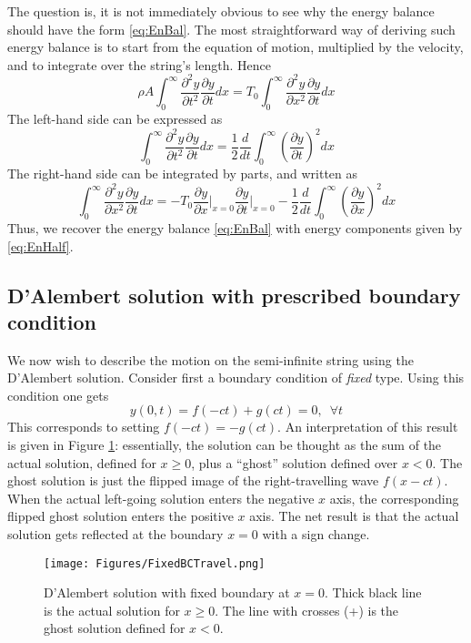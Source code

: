 \noindent
The question is, it is not immediately obvious to see why the energy balance should have the form \eqref{eq:EnBal}. The most straightforward way of deriving such energy balance is to start from the equation of motion, multiplied by the velocity, and to integrate over the string's length. Hence
\begin{equation}
\rho A \int_0^{\infty} \frac{\partial^2 y}{\partial t^2} \frac{\partial y}{\partial t} dx = T_0 \int_0^{\infty} \frac{\partial^2 y}{\partial x^2} \frac{\partial y}{\partial t} dx
\end{equation}
The left-hand side can be expressed as
\begin{equation}
\int_0^{\infty}\frac{\partial^2 y}{\partial t^2} \frac{\partial y}{\partial t} dx = \frac{1}{2}\frac{d}{dt}\int_0^{\infty} \left( \frac{\partial y}{\partial t}\right)^2 dx
\end{equation}
The right-hand side can be integrated by parts, and written as
\begin{equation}
\int_0^{\infty} \frac{\partial^2 y}{\partial x^2} \frac{\partial y}{\partial t} dx = - T_0 \frac{\partial y}{\partial x }\Bigg|_{x=0}\frac{\partial y}{\partial t }\Bigg|_{x=0} - \frac{1}{2}\frac{d}{dt}  \int_0^{\infty}\left( \frac{\partial y}{\partial x}\right)^2 dx
\end{equation}
Thus, we recover the energy balance \eqref{eq:EnBal} with energy components given by \eqref{eq:EnHalf}. 





\subsection{D'Alembert solution with prescribed boundary condition}


We now wish to describe the motion on the semi-infinite string using the D'Alembert solution. Consider first a boundary condition of \emph{fixed} type. Using this condition one gets
\begin{equation}
y(0,t) = f(-ct) + g(ct) = 0, \,\,\, \forall t
\end{equation}
This corresponds to setting $f(-ct) = -g(ct)$. An interpretation of this result is given in Figure \ref{fig:DalFixed}: essentially, the solution can be thought as the sum of the actual solution, defined for $x\geq 0$, plus a ``ghost'' solution defined over $x<0$. The ghost solution is just the flipped image of the right-travelling wave $f(x-ct)$. When the actual left-going solution enters the negative $x$ axis, the corresponding flipped ghost solution enters the positive $x$ axis. The net result is that the actual solution gets reflected at the boundary $x=0$ with a sign change. 
\begin{figure}[hbt]
\texttt{[image: Figures/FixedBCTravel.png]}
\caption{D'Alembert solution with fixed boundary at $x=0$. Thick black line is the actual solution for $x\geq 0$. The line with crosses (+) is the ghost solution defined for $x<0$.}\label{fig:DalFixed}
\end{figure}

